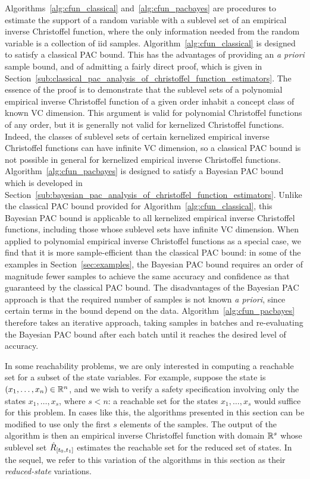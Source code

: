 \documentclass[onefignum,onetabnum]{siamart171218}
\begin{document}
Algorithms~\ref{alg:cfun_classical} and~\ref{alg:cfun_pacbayes} are procedures
to estimate the support of a random variable with a sublevel set of an
empirical inverse Christoffel function, where the only information needed from
the random variable is a collection of iid samples. 
Algorithm~\ref{alg:cfun_classical} is designed to satisfy a classical PAC bound.
This has the advantages of providing an \emph{a priori} sample bound, and of
admitting a fairly direct proof, which is given in 
Section~\ref{sub:classical_pac_analysis_of_christoffel_function_estimators}. The
essence of the proof is to demonstrate that the sublevel sets of a polynomial empirical
inverse Christoffel function of a given order inhabit a concept class of known
VC dimension. This argument is valid for polynomial Christoffel functions of any
order,
but it is generally not valid for kernelized Christoffel functions. Indeed, the
classes of sublevel sets of certain kernelized empirical inverse Christoffel
functions can have infinite VC dimension, so a classical PAC bound is not
possible in general for kernelized empirical inverse Christoffel functions.
Algorithm~\ref{alg:cfun_pacbayes} is designed to satisfy a Bayesian PAC bound
which is developed in
Section~\ref{sub:bayesian_pac_analysis_of_christoffel_function_estimators}.
Unlike the classical PAC bound provided for Algorithm~\ref{alg:cfun_classical},
this Bayesian PAC bound is applicable to all kernelized empirical inverse
Christoffel functions, including those whose sublevel sets have infinite VC
dimension. 
When applied to 
polynomial empirical inverse Christoffel
functions as a special case, we find that it is more sample-efficient than the
classical PAC bound:
in some of the examples in Section~\ref{sec:examples}, the
Bayesian PAC bound requires an order of magnitude fewer samples to achieve the
same accuracy and confidence as that guaranteed by the classical PAC bound.
The disadvantages of the Bayesian PAC approach is that the required number of
samples is not known \emph{a priori}, since certain terms in the bound depend on
the data. Algorithm~\ref{alg:cfun_pacbayes} therefore takes an iterative
approach, taking samples in batches and re-evaluating the Bayesian PAC bound
after each batch until it reaches the desired level of accuracy.

\begin{remark}
    \label{rmk:rs_subset}
    In some reachability problems, we are only interested in computing a
    reachable set for a subset of the state variables.
    For example, suppose the state is $(x_1,\dotsc,x_n)\in\mathbb{R}^n$, and we wish to
    verify a safety specification involving only the states $x_1,\dotsc,x_s$,
    where $s<n$: a reachable set for the states $x_1,\dotsc,x_s$ would suffice
    for this problem.
    In cases like this, the algorithms presented in this section can be modified
    to use only the first
    $s$ elements of the samples. The output of the algorithm is then
    an empirical inverse Christoffel function with domain $\mathbb{R}^s$ whose sublevel
    set $\hat{R}_{[t_0,t_1]}$ estimates the reachable set for the reduced set of states.
    In the sequel, we refer to this variation of the algorithms in this
    section as their \emph{reduced-state} variations.
\end{remark}
\end{document}
